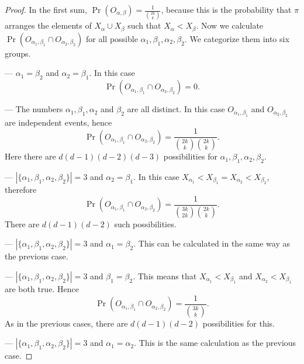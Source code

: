 \documentclass[12pt,a4paper]{amsart}
\numberwithin{equation}{section}
\theoremstyle{plain}
\theoremstyle{definition}
\begin{document}
\begin{proof}
In the first sum, $\Pr(O_{\alpha,\beta})=\frac{1}{\binom{2k}{k}}$, because this is the probability that $\pi$ arranges the elements of $X_\alpha\cup X_\beta$ such that $X_\alpha< X_\beta$.
Now we calculate $\Pr(O_{\alpha_1,\beta_1}\cap O_{\alpha_2,\beta_2})$ for all possible $\alpha_1, \beta_1, \alpha_2, \beta_2$. We categorize them  into %
 six groups.


---\enskip
$\alpha_1=\beta_2$ and $\alpha_2=\beta_1$. In this case
$$\Pr(O_{\alpha_1,\beta_1}\cap O_{\alpha_2,\beta_2})=0.$$

---\enskip
 The numbers $\alpha_1, \beta_1, \alpha_2$ and $\beta_2$ are all distinct. In this case $O_{\alpha_1,\beta_1}$ and $O_{\alpha_2,\beta_2}$ are independent events, hence
$$\Pr(O_{\alpha_1,\beta_1}\cap O_{\alpha_2,\beta_2})=\frac{1}{\binom{2k}{k}\binom{2k}{k}}.$$
Here there are  $d(d-1)(d-2)(d-3)$ possibilities for $\alpha_1, \beta_1, \alpha_2, \beta_2$.

---\enskip
 $|\{\alpha_1, \beta_1, \alpha_2, \beta_2\}|=3$ and $\alpha_2=\beta_1$. In this case $X_{\alpha_1}<X_{\beta_1}=X_{\alpha_2}<X_{\beta_2}$, therefore
$$\Pr(O_{\alpha_1,\beta_1}\cap O_{\alpha_2,\beta_2})=\frac{1}{\binom{3k}{2k}\binom{2k}{k}}.$$
There are $d(d-1)(d-2)$ such possibilities.

---\enskip
 $|\{\alpha_1, \beta_1, \alpha_2, \beta_2\}|=3$ and $\alpha_1=\beta_2$. This can be calculated in the same way as the previous case.

---\enskip
 $|\{\alpha_1, \beta_1, \alpha_2, \beta_2\}|=3$ and $\beta_1=\beta_2$. This means that $X_{\alpha_1}<X_{\beta_1}$ and $X_{\alpha_2}<X_{\beta_1}$ are both true. Hence
$$\Pr(O_{\alpha_1,\beta_1}\cap O_{\alpha_2,\beta_2})=\frac{1}{\binom{3k}{k}}.$$
As in the previous cases, there are  $d(d-1)(d-2)$ possibilities for this.

---\enskip
 $|\{\alpha_1, \beta_1, \alpha_2, \beta_2\}|=3$ and $\alpha_1=\alpha_2$.
This is the same calculation as the previous case.


\end{proof}
\end{document}
